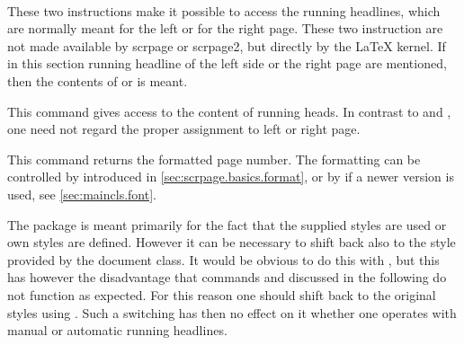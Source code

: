 \begin{Declaration}
  \\
\end{Declaration}%
%
These two instructions make it possible to access the running headlines,
which are normally meant for the left or for the right page. These two
instruction are not made available by scrpage or scrpage2, but directly
by the \LaTeX{} kernel. If in this section running headline of the
left side or the right page are mentioned,
then the contents of  or 
is meant.
%
%

\begin{Declaration}
\end{Declaration}%
This command gives access to the content of running heads.
In contrast to  and , one
need not regard the proper assignment to left or right page.

\begin{Declaration}
\end{Declaration}%
This command returns the formatted page number. The formatting can be
controlled by  introduced in
\autoref{sec:scrpage.basics.format}, 
or by  if a newer version \KOMAScript{} is used, see
\autoref{sec:maincls.font}.

\begin{Declaration}
\end{Declaration}%
The package  is meant primarily for the fact that the supplied
styles are used or own styles are defined. However it can be necessary
to shift back also to the style provided by the document class.
It would be obvious to do this with ,
but this has however the disadvantage that commands
 and  discussed in the following
do not function as expected.
For this reason one should shift back to the original styles using
.
Such a switching has then no effect on it whether one
operates with manual or automatic running headlines.
%


